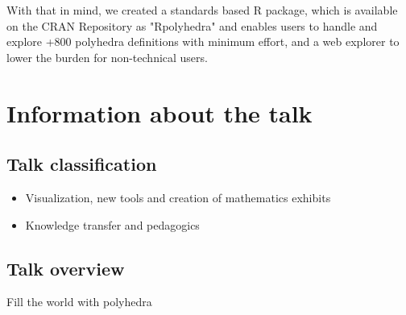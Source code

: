 \documentclass[a4paper,10pt]{article}
\begin{document}
With that in mind, we created a standards based R package, which is available on the CRAN Repository as "Rpolyhedra" and enables users to handle and explore +800 polyhedra definitions with minimum effort, and a web explorer \cite{RPOLY_EXPLORER} to lower the burden for non-technical users.


     

\section{Information about the talk}

\subsection{Talk classification}

\begin{itemize}
\item Visualization, new tools and creation of mathematics exhibits
\item Knowledge transfer and pedagogics 
\end{itemize}

\subsection{Talk overview}



Fill the world with polyhedra
\end{document}
